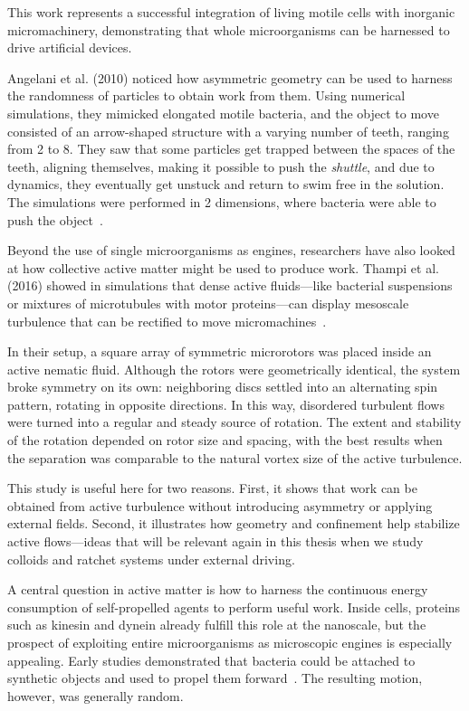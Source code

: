 This work represents a successful integration of living motile cells with inorganic micromachinery, demonstrating that whole microorganisms can be harnessed to drive artificial devices. 


Angelani et al. (2010) noticed how asymmetric geometry can be used to harness the randomness of particles to obtain work from them. Using numerical simulations, they mimicked elongated motile bacteria, and the object to move consisted of an arrow-shaped structure with a varying number of teeth, ranging from 2 to 8. They saw that some particles get trapped between the spaces of the teeth, aligning themselves, making it possible to push the \textit{shuttle}, and due to dynamics, they eventually get unstuck and return to swim free in the solution. The simulations were performed in 2 dimensions, where bacteria were able to push the object~\cite{angelani2010geometrically}.

Beyond the use of single microorganisms as engines, researchers have also looked at how collective active matter might be used to produce work. Thampi et al. (2016) showed in simulations that dense active fluids—like bacterial suspensions or mixtures of microtubules with motor proteins—can display mesoscale turbulence that can be rectified to move micromachines~\cite{thampi2016active}.

In their setup, a square array of symmetric microrotors was placed inside an active nematic fluid. Although the rotors were geometrically identical, the system broke symmetry on its own: neighboring discs settled into an alternating spin pattern, rotating in opposite directions. In this way, disordered turbulent flows were turned into a regular and steady source of rotation. The extent and stability of the rotation depended on rotor size and spacing, with the best results when the separation was comparable to the natural vortex size of the active turbulence.

This study is useful here for two reasons. First, it shows that work can be obtained from active turbulence without introducing asymmetry or applying external fields. Second, it illustrates how geometry and confinement help stabilize active flows—ideas that will be relevant again in this thesis when we study colloids and ratchet systems under external driving.

A central question in active matter is how to harness the continuous energy consumption of self-propelled agents to perform useful work. Inside cells, proteins such as kinesin and dynein already fulfill this role at the nanoscale, but the prospect of exploiting entire microorganisms as microscopic engines is especially appealing. Early studies demonstrated that bacteria could be attached to synthetic objects and used to propel them forward~\cite{weibel2005microoxen, hiratsuka2006microrotary}. The resulting motion, however, was generally random.

